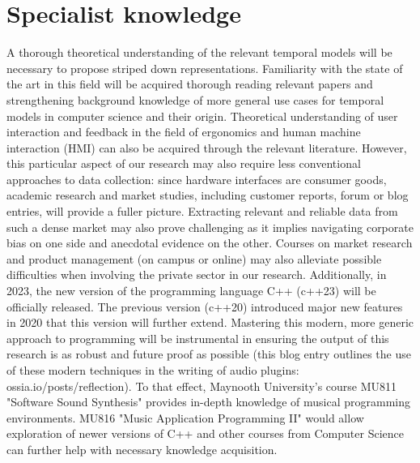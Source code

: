 \documentclass[journal,onecolumn]{IEEEtran}
\begin{document}
\section{Specialist knowledge} %
A thorough theoretical understanding of the relevant temporal models will be necessary to propose striped down representations. Familiarity with the state of the art in this field will be acquired thorough reading relevant papers and strengthening background knowledge of more general use cases for temporal models in computer science and their origin. Theoretical understanding of user interaction and feedback in the field of ergonomics and human machine interaction (HMI) can also be acquired through the relevant literature. However, this particular aspect of our research may also require less conventional approaches to data collection: since hardware interfaces are consumer goods,  academic research and market studies, including customer reports, forum or blog entries, will provide a fuller picture.
Extracting relevant and reliable data from such a dense market may also prove challenging as it implies navigating corporate bias on one side and anecdotal evidence on the other. Courses on market research and product management (on campus or online) may also alleviate possible difficulties when involving the private sector in our research.
Additionally, in 2023, the new version of the programming language C++ (c++23) will be officially released. The previous version (c++20) introduced major new features in 2020 that this version will further extend. Mastering this modern, more generic approach to programming will be instrumental in ensuring the output of this research is as robust and future proof as possible (this blog entry outlines the use of these modern techniques in the writing of audio plugins: ossia.io/posts/reflection). To that effect, Maynooth University's course MU811 "Software Sound Synthesis" provides in-depth knowledge of musical programming environments. MU816 "Music Application Programming II" would allow exploration of newer versions of C++ and other courses from Computer Science can further help with necessary knowledge acquisition.
\end{document}
